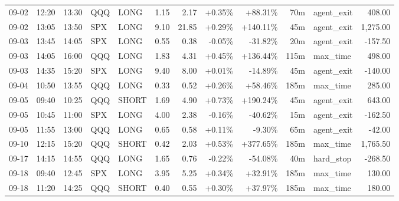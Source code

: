 \documentclass[11pt,a4paper,twoside]{article}
\begin{document}
\begin{center}
\begin{longtable}{>{\color{txtmain}}l l l l l r r r r r >{\color{txtmain}}l r}
09-02 & 12:20 & 13:30 & QQQ & LONG & 1.15 & 2.17 & \textcolor{wingreen}{+0.35\%} & \textcolor{wingreen}{+88.31\%} & 70m & agent\_exit & \textcolor{wingreen}{408.00} \\
09-02 & 13:05 & 13:50 & SPX & LONG & 9.10 & 21.85 & \textcolor{wingreen}{+0.29\%} & \textcolor{wingreen}{+140.11\%} & 45m & agent\_exit & \textcolor{wingreen}{1,275.00} \\
09-03 & 13:45 & 14:05 & SPX & LONG & 0.55 & 0.38 & \textcolor{lossred}{-0.05\%} & \textcolor{lossred}{-31.82\%} & 20m & agent\_exit & \textcolor{lossred}{-157.50} \\
09-03 & 14:05 & 16:00 & QQQ & LONG & 1.83 & 4.31 & \textcolor{wingreen}{+0.45\%} & \textcolor{wingreen}{+136.44\%} & 115m & max\_time & \textcolor{wingreen}{498.00} \\
09-03 & 14:35 & 15:20 & SPX & LONG & 9.40 & 8.00 & \textcolor{wingreen}{+0.01\%} & \textcolor{lossred}{-14.89\%} & 45m & agent\_exit & \textcolor{lossred}{-140.00} \\
09-04 & 10:50 & 13:55 & QQQ & LONG & 0.33 & 0.52 & \textcolor{wingreen}{+0.26\%} & \textcolor{wingreen}{+58.46\%} & 185m & max\_time & \textcolor{wingreen}{285.00} \\
09-05 & 09:40 & 10:25 & QQQ & SHORT & 1.69 & 4.90 & \textcolor{wingreen}{+0.73\%} & \textcolor{wingreen}{+190.24\%} & 45m & agent\_exit & \textcolor{wingreen}{643.00} \\
09-05 & 10:45 & 11:00 & SPX & LONG & 4.00 & 2.38 & \textcolor{lossred}{-0.16\%} & \textcolor{lossred}{-40.62\%} & 15m & agent\_exit & \textcolor{lossred}{-162.50} \\
09-05 & 11:55 & 13:00 & QQQ & LONG & 0.65 & 0.58 & \textcolor{wingreen}{+0.11\%} & \textcolor{lossred}{-9.30\%} & 65m & agent\_exit & \textcolor{lossred}{-42.00} \\
09-10 & 12:15 & 15:20 & QQQ & SHORT & 0.42 & 2.03 & \textcolor{wingreen}{+0.53\%} & \textcolor{wingreen}{+377.65\%} & 185m & max\_time & \textcolor{wingreen}{1,765.50} \\
09-17 & 14:15 & 14:55 & QQQ & LONG & 1.65 & 0.76 & \textcolor{lossred}{-0.22\%} & \textcolor{lossred}{-54.08\%} & 40m & hard\_stop & \textcolor{lossred}{-268.50} \\
09-18 & 09:40 & 12:45 & SPX & LONG & 3.95 & 5.25 & \textcolor{wingreen}{+0.34\%} & \textcolor{wingreen}{+32.91\%} & 185m & max\_time & \textcolor{wingreen}{130.00} \\
09-18 & 11:20 & 14:25 & QQQ & SHORT & 0.40 & 0.55 & \textcolor{wingreen}{+0.30\%} & \textcolor{wingreen}{+37.97\%} & 185m & max\_time & \textcolor{wingreen}{180.00} \\

\end{longtable}
\end{center}
\end{document}
